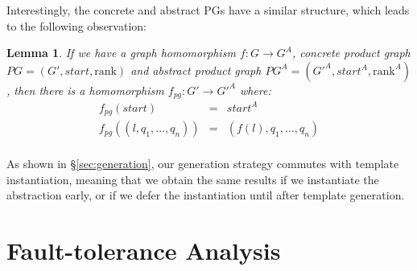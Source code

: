 \documentclass[numbers, 10pt, preprint]{sigplanconf}
\newcommand{\EG}{\emph{e.g.}}
\newcommand{\IE}{\emph{i.e.}}
\newcommand{\Pref}{\ensuremath{\mathrm{rank}}}
\newtheorem{lem}[thm]{Lemma}
\begin{document}
Interestingly, the concrete and abstract PGs have a similar structure, which leads to the following observation:

\begin{lem}
\label{lem:homomorphism}
If we have a graph homomorphism $f : G \rightarrow G^A$, concrete product graph $PG = (G',\mathit{start},\Pref)$ and abstract product graph $PG^A = (G'^A, \mathit{start}^A, \Pref^A)$, then there is a homomorphism $f_{pg} : G' \rightarrow G'^A$ where:
\[ \begin{array}{rcl}
  f_{pg}( \mathit{start} ) & = & \mathit{start}^A  \\
  f_{pg}( (l,q_1,\ldots,q_n) ) & = & (f(l),q_1,\ldots,q_n) \\
\end{array} \]
\end{lem}
%
As shown in \S\ref{sec:generation}, our generation strategy commutes with template instantiation, meaning that we obtain the same results if we instantiate the abstraction early, or if we defer the instantiation until after template generation.
%



%
%
%
%


\section{Fault-tolerance Analysis}
\label{sec:analysis}

\end{document}
